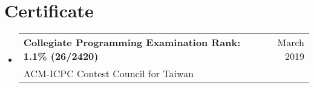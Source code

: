 \documentclass[A4,11pt]{article}
\makeatletter
\newcommand{\CVSubheading}[4]{
  \vspace{-2pt}\item
    \begin{tabular*}{0.97\textwidth}[t]{l@{\extracolsep{\fill}}r}
      \textbf{#1} & #2 \\
      \small#3 & \small #4 \\
    \end{tabular*}\vspace{-7pt}
}
\newcommand{\CVSubHeadingListStart}{\begin{itemize}[leftmargin=0.5cm, label={}]}
\newcommand{\CVSubHeadingListEnd}{\end{itemize}}
\makeatother
\begin{document}
\section{Certificate}
  \CVSubHeadingListStart
    \CVSubheading
      {Collegiate Programming Examination Rank: 1.1\% (26/2420)}{March 2019}
      {ACM-ICPC Contest Council for Taiwan}{}      
  \CVSubHeadingListEnd

\begin{comment}
  Section is here as it applied to my application for positions in academia. 
  Remember to tailor the resume for to the position.
  \end{comment}
  


\begin{comment}
This section is compressed from the various skills sections that Euro CV
recommends.
\end{comment}
\end{document}
